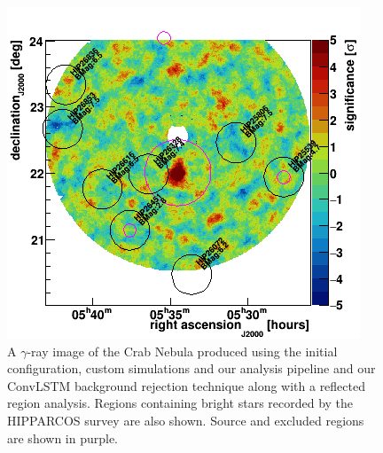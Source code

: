 \begin{figure}[h] 
        \centering \includegraphics[width=\columnwidth]{figures/skysig.png}

        \caption{
                \label{fig:skysig} A $\gamma$-ray image of the Crab Nebula produced using the initial configuration, custom simulations and our analysis pipeline and our ConvLSTM background rejection technique along with a reflected region analysis. Regions containing bright stars recorded by the HIPPARCOS survey are also shown. Source and excluded regions are shown in purple.
        }
\end{figure}
